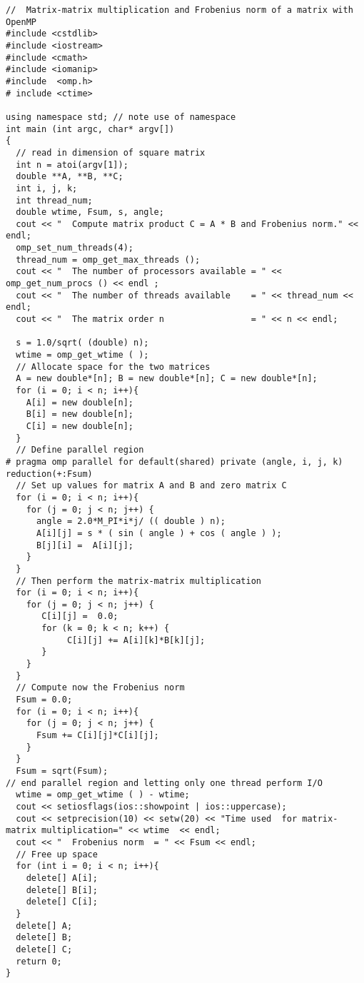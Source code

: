 \documentclass[%
oneside,                 %
final,                   %
10pt]{article}
\begin{document}
\begin{verbatim}
//  Matrix-matrix multiplication and Frobenius norm of a matrix with OpenMP
#include <cstdlib>
#include <iostream>
#include <cmath>
#include <iomanip>
#include  <omp.h>
# include <ctime>

using namespace std; // note use of namespace
int main (int argc, char* argv[])
{
  // read in dimension of square matrix
  int n = atoi(argv[1]);
  double **A, **B, **C;
  int i, j, k;
  int thread_num;
  double wtime, Fsum, s, angle;
  cout << "  Compute matrix product C = A * B and Frobenius norm." << endl;
  omp_set_num_threads(4);
  thread_num = omp_get_max_threads ();
  cout << "  The number of processors available = " << omp_get_num_procs () << endl ;
  cout << "  The number of threads available    = " << thread_num <<  endl;
  cout << "  The matrix order n                 = " << n << endl;

  s = 1.0/sqrt( (double) n);
  wtime = omp_get_wtime ( );
  // Allocate space for the two matrices
  A = new double*[n]; B = new double*[n]; C = new double*[n];
  for (i = 0; i < n; i++){
    A[i] = new double[n];
    B[i] = new double[n];
    C[i] = new double[n];
  }
  // Define parallel region
# pragma omp parallel for default(shared) private (angle, i, j, k) reduction(+:Fsum)
  // Set up values for matrix A and B and zero matrix C
  for (i = 0; i < n; i++){
    for (j = 0; j < n; j++) {
      angle = 2.0*M_PI*i*j/ (( double ) n);
      A[i][j] = s * ( sin ( angle ) + cos ( angle ) );
      B[j][i] =  A[i][j];
    }
  }
  // Then perform the matrix-matrix multiplication
  for (i = 0; i < n; i++){
    for (j = 0; j < n; j++) {
       C[i][j] =  0.0;    
       for (k = 0; k < n; k++) {
            C[i][j] += A[i][k]*B[k][j];
       }
    }
  }
  // Compute now the Frobenius norm
  Fsum = 0.0;
  for (i = 0; i < n; i++){
    for (j = 0; j < n; j++) {
      Fsum += C[i][j]*C[i][j];
    }
  }
  Fsum = sqrt(Fsum);
// end parallel region and letting only one thread perform I/O
  wtime = omp_get_wtime ( ) - wtime;
  cout << setiosflags(ios::showpoint | ios::uppercase);
  cout << setprecision(10) << setw(20) << "Time used  for matrix-matrix multiplication=" << wtime  << endl;
  cout << "  Frobenius norm  = " << Fsum << endl;
  // Free up space
  for (int i = 0; i < n; i++){
    delete[] A[i];
    delete[] B[i];
    delete[] C[i];
  }
  delete[] A;
  delete[] B;
  delete[] C;
  return 0;
}



\end{verbatim}



\end{document}
